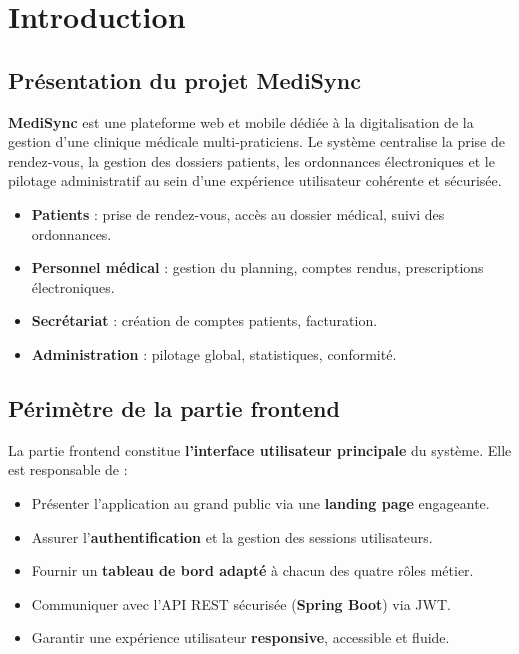 \documentclass[11pt,a4paper]{article}
\begin{document}
\renewcommand{\contentsname}{\color{primary}\textbf{Sommaire}}
\tableofcontents
\thispagestyle{empty}
\newpage

\section{Introduction}

\subsection{Présentation du projet MediSync}

\textbf{MediSync} est une plateforme web et mobile dédiée à la digitalisation
de la gestion d'une clinique médicale multi-praticiens. Le système centralise
la prise de rendez-vous, la gestion des dossiers patients, les ordonnances
électroniques et le pilotage administratif au sein d'une expérience utilisateur
cohérente et sécurisée.

\begin{infobox}[title={Objectifs métiers}]
\begin{itemize}
  \item \textbf{Patients} : prise de rendez-vous, accès au dossier médical, suivi des ordonnances.
  \item \textbf{Personnel médical} : gestion du planning, comptes rendus, prescriptions électroniques.
  \item \textbf{Secrétariat} : création de comptes patients, facturation.
  \item \textbf{Administration} : pilotage global, statistiques, conformité.
\end{itemize}
\end{infobox}

\subsection{Périmètre de la partie frontend}

La partie frontend constitue \textbf{l'interface utilisateur principale}
du système. Elle est responsable de :

\begin{itemize}
  \item Présenter l'application au grand public via une \textbf{landing page} engageante.
  \item Assurer l'\textbf{authentification} et la gestion des sessions utilisateurs.
  \item Fournir un \textbf{tableau de bord adapté} à chacun des quatre rôles métier.
  \item Communiquer avec l'API REST sécurisée (\textbf{Spring Boot}) via JWT.
  \item Garantir une expérience utilisateur \textbf{responsive}, accessible et fluide.
\end{itemize}
\end{document}
